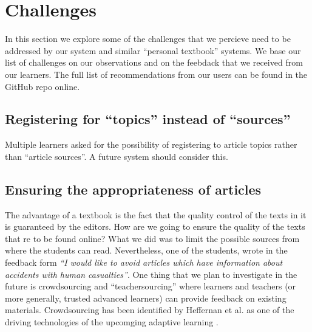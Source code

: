 \newpage
\section{Challenges}
\label{sec:challenges}

In this section we explore some of the challenges that we percieve need to be addressed by our system and similar ``personal textbook'' systems. We base our list of challenges on our observations and on the feebdack that we received from our learners. The full list of recommendations from our users can be found in the GitHub repo online.

\subsection{Registering for ``topics'' instead of ``sources''}
Multiple learners asked for the possibility of registering to article topics rather than ``article sources''. A future system should consider this.

\subsection{Ensuring the appropriateness of articles}
The advantage of a textbook is the fact that the quality control of the texts in it is guaranteed by the editors. How are we going to ensure the quality of the texts that re to be found online? What we did was to limit the possible sources from where the students can read. Nevertheless, one of the students, wrote in the feedback form {\em ``I would like to avoid articles which have information about accidents with human casualties''}. One thing that we plan to investigate in the future is crowdsourcing and ``teachersourcing'' where learners and teachers (or more generally, trusted advanced learners) can provide feedback on existing materials. Crowdsourcing has been identified by Heffernan et al. as one of the driving technologies of the upcomging adaptive learning \cite{Heff16-crowdsourcing}. 




